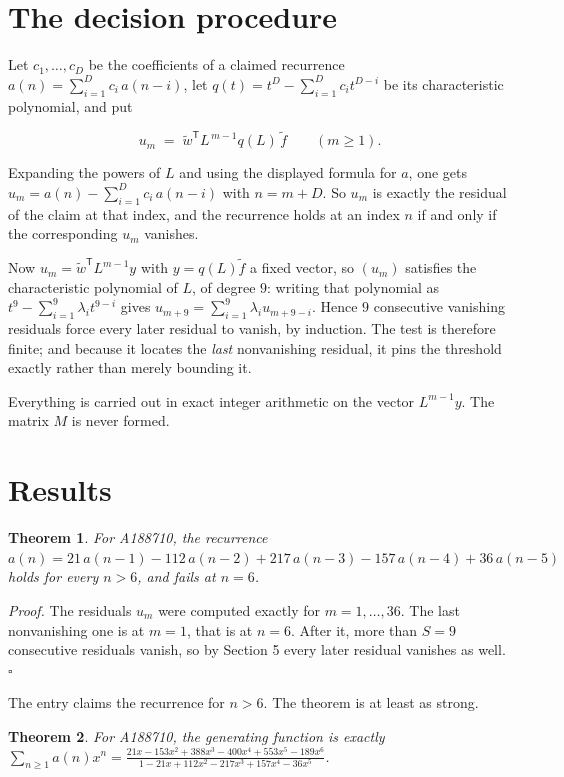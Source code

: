 \documentclass[11pt]{article}
\newtheorem{theorem}{Theorem}
\theoremstyle{definition}
\begin{document}
\section{The decision procedure}

Let $c_1,\dots,c_D$ be the coefficients of a claimed recurrence $a(n) = \sum_{i=1}^{D} c_i\,a(n-i)$, let $q(t) = t^{D} - \sum_{i=1}^{D} c_i t^{D-i}$ be its characteristic polynomial, and put

\[u_m \;=\; \tilde w^{\mathsf T} L^{\,m-1} q(L)\,\tilde f \qquad (m \ge 1).\]

Expanding the powers of $L$ and using the displayed formula for $a$, one gets $u_m = a(n) - \sum_{i=1}^{D} c_i\,a(n-i)$ with $n = m + D$. So $u_m$ is exactly the residual of the claim at that index, and the recurrence holds at an index $n$ if and only if the corresponding $u_m$ vanishes.

Now $u_m = \tilde w^{\mathsf T} L^{m-1} y$ with $y = q(L)\tilde f$ a fixed vector, so $(u_m)$ satisfies the characteristic polynomial of $L$, of degree $9$: writing that polynomial as $t^{9} - \sum_{i=1}^{9} \lambda_i t^{9-i}$ gives $u_{m+9} = \sum_{i=1}^{9} \lambda_i u_{m+9-i}$. Hence $9$ consecutive vanishing residuals force every later residual to vanish, by induction. The test is therefore finite; and because it locates the {\itshape last} nonvanishing residual, it pins the threshold exactly rather than merely bounding it.

Everything is carried out in exact integer arithmetic on the vector $L^{m-1}y$. The matrix $M$ is never formed.

\section{Results}

\begin{theorem} For A188710, the recurrence $a(n) = 21\,a(n-1) - 112\,a(n-2) + 217\,a(n-3) - 157\,a(n-4) + 36\,a(n-5)$ holds for every $n > 6$, and fails at $n = 6$.\end{theorem}

{\itshape Proof.} The residuals $u_m$ were computed exactly for $m = 1,\dots,36$. The last nonvanishing one is at $m = 1$, that is at $n = 6$. After it, more than $S = 9$ consecutive residuals vanish, so by Section 5 every later residual vanishes as well. $\square$

The entry claims the recurrence for $n > 6$. The theorem is at least as strong.

\begin{theorem} For A188710, the generating function is exactly $\sum_{n\ge 1} a(n)x^n = \frac{21x - 153x^{2} + 388x^{3} - 400x^{4} + 553x^{5} - 189x^{6}}{1 - 21x + 112x^{2} - 217x^{3} + 157x^{4} - 36x^{5}}$.\end{theorem}
\end{document}
